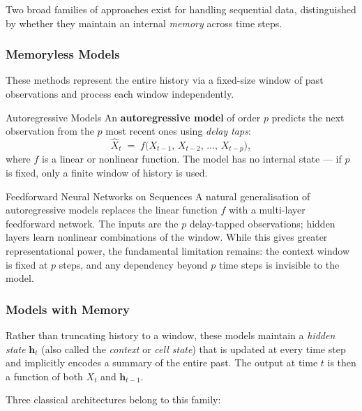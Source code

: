 \documentclass[11pt,a4paper]{article}
\newcommand{\term}[1]{\textcolor{DefGreen}{\textbf{#1}}}
\begin{document}
Two broad families of approaches exist for handling sequential data, distinguished by whether they maintain an internal \emph{memory} across time steps.

\subsubsection{Memoryless Models}

These methods represent the entire history via a fixed-size window of past observations and process each window independently.

\begin{defbox}{Autoregressive Models}
An \term{autoregressive model} of order $p$ predicts the next observation from the $p$ most recent ones using \emph{delay taps}:
\[
  \hat{X}_t \;=\; f\bigl(X_{t-1},\, X_{t-2},\, \ldots,\, X_{t-p}\bigr),
\]
where $f$ is a linear or nonlinear function. The model has no internal state — if $p$ is fixed, only a finite window of history is used.
\end{defbox}

\begin{defbox}{Feedforward Neural Networks on Sequences}
A natural generalisation of autoregressive models replaces the linear function $f$ with a multi-layer feedforward network. The inputs are the $p$ delay-tapped observations; hidden layers learn nonlinear combinations of the window. While this gives greater representational power, the fundamental limitation remains: the context window is fixed at $p$ steps, and any dependency beyond $p$ time steps is invisible to the model.
\end{defbox}

\subsubsection{Models with Memory}

Rather than truncating history to a window, these models maintain a \emph{hidden state} $\mathbf{h}_t$ (also called the \emph{context} or \emph{cell state}) that is updated at every time step and implicitly encodes a summary of the entire past. The output at time $t$ is then a function of both $X_t$ and $\mathbf{h}_{t-1}$.

Three classical architectures belong to this family:
\end{document}
